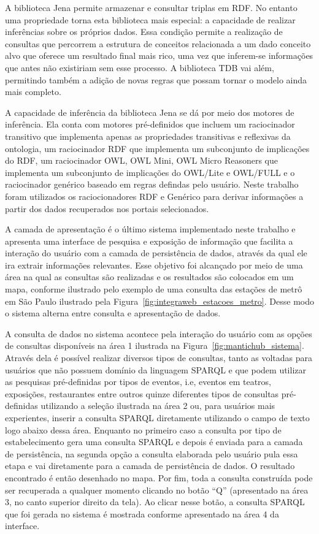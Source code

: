 A biblioteca Jena permite armazenar e consultar triplas em RDF. No entanto uma propriedade torna esta biblioteca mais especial: a capacidade de realizar inferências sobre os próprios dados. Essa condição permite a realização de consultas que percorrem a estrutura de conceitos relacionada a um dado conceito alvo que oferece um resultado final mais rico, uma vez que inferem-se informações que antes não existiriam sem esse processo. A biblioteca TDB vai além, permitindo também a adição de novas regras que possam tornar o modelo ainda mais completo.

A capacidade de inferência da biblioteca Jena se dá por meio dos motores de inferência. Ela conta com motores pré-definidos que incluem um raciocinador transitivo que implementa apenas as propriedades transitivas e reflexivas da ontologia, um raciocinador RDF que implementa um subconjunto de implicações do RDF, um raciocinador OWL, OWL Mini, OWL Micro Reasoners que implementa um subconjunto de implicações do OWL/Lite e OWL/FULL e o raciocinador genérico baseado em regras defindas pelo usuário. Neste trabalho foram utilizados os raciocionadores RDF e Genérico para derivar informações a partir dos dados recuperados nos portais selecionados.

A camada de apresentação é o último sistema implementado neste trabalho e apresenta uma interface de pesquisa e exposição de informação que facilita a interação do usuário com a camada de persistência de dados, através da qual ele ira extrair informações relevantes. Esse objetivo foi alcançado por meio de uma área na qual as consultas são realizadas e os resultados são colocados em um mapa, conforme ilustrado pelo exemplo de uma consulta das estações de metrô em São Paulo ilustrado pela Figura~\ref{fig:integraweb_estacoes_metro}. Desse modo o sistema alterna entre consulta e apresentação de dados.

A consulta de dados no sistema acontece pela interação do usuário com as opções de consultas disponíveis na área 1 ilustrada na Figura~\ref{fig:mantichub_sistema}. Através dela é possível realizar diversos tipos de consultas, tanto as voltadas para usuários que não possuem domínio da linguagem SPARQL e que podem utilizar as pesquisas  pré-definidas por tipos de eventos, i.e, eventos em teatros, exposições, restaurantes entre outros quinze diferentes tipos de consultas pré-definidas utilizando a seleção ilustrada na área 2 ou, para usuários mais experientes, inserir a consulta SPARQL diretamente utilizando o campo de texto logo abaixo dessa área. Enquanto no primeiro caso a consulta por tipo de estabelecimento gera uma consulta SPARQL e depois é enviada para a camada de persistência, na segunda opção a consulta elaborada pelo usuário pula essa etapa e vai diretamente para a camada de persistência de dados. O resultado encontrado é então desenhado no mapa. Por fim, toda a consulta construída pode ser recuperada a qualquer momento clicando no botão ``Q'' (apresentado na área 3, no canto superior direito da tela). Ao clicar nesse botão, a consulta SPARQL que foi gerada no sistema é mostrada conforme apresentado na área 4 da interface.

